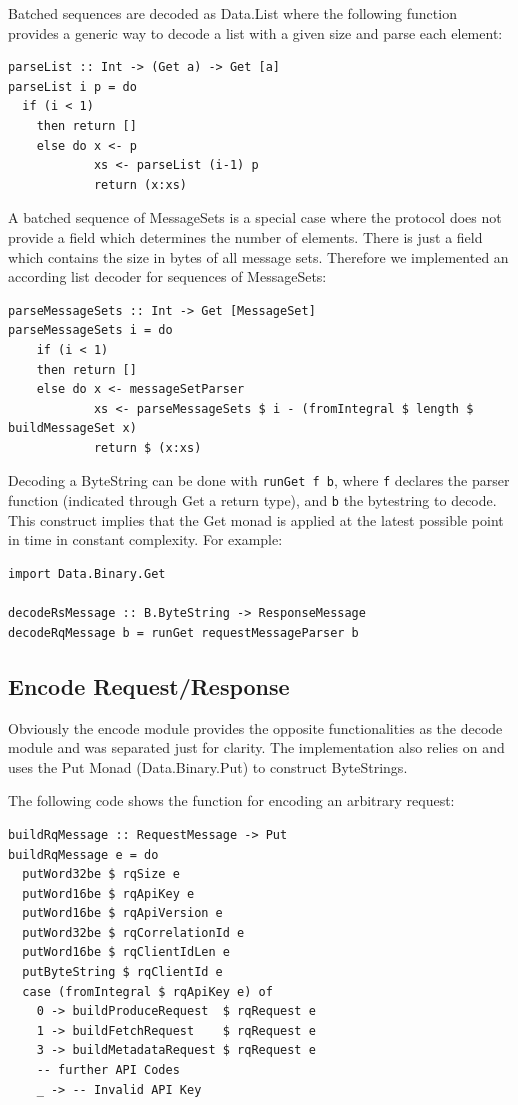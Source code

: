 Batched sequences are decoded as Data.List where the following function
provides a generic way to decode a list with a given size and parse each
element:
\begin{lstlisting}[caption={Decode list of any type}]
parseList :: Int -> (Get a) -> Get [a]
parseList i p = do 
  if (i < 1) 
    then return []
    else do x <- p
            xs <- parseList (i-1) p
            return (x:xs)
\end{lstlisting}

A batched sequence of MessageSets is a special case where the protocol does not provide a
field which determines the number of elements. There is just a field which contains
the size in bytes of all message sets. Therefore we implemented an according
list decoder for sequences of MessageSets:
\begin{lstlisting}[caption={Decode list of MessageSet's}]
parseMessageSets :: Int -> Get [MessageSet]
parseMessageSets i = do
    if (i < 1)
    then return []
    else do x <- messageSetParser
            xs <- parseMessageSets $ i - (fromIntegral $ length $ buildMessageSet x)
            return $ (x:xs) 
\end{lstlisting}

Decoding a ByteString can be done with \lstinline{runGet f b}, where
\lstinline{f} declares the parser function (indicated through Get a return type),
and  \lstinline{b} the bytestring to decode. This construct implies that the Get
monad is applied at the latest possible point in time in constant complexity. For example: 
\begin{lstlisting}
import Data.Binary.Get

decodeRsMessage :: B.ByteString -> ResponseMessage
decodeRqMessage b = runGet requestMessageParser b

\end{lstlisting}


\subsection{Encode Request/Response}
\label{sec:impl-prot-encoding}
Obviously the encode module provides the opposite functionalities as the decode
module and was separated just for clarity. The implementation also relies on
and uses the Put Monad (Data.Binary.Put) to construct ByteStrings.

The following code shows the function for encoding an arbitrary request:
\begin{lstlisting}[caption={Encode RequestMessage, depending on ApiKey}]
buildRqMessage :: RequestMessage -> Put
buildRqMessage e = do
  putWord32be $ rqSize e
  putWord16be $ rqApiKey e
  putWord16be $ rqApiVersion e
  putWord32be $ rqCorrelationId e
  putWord16be $ rqClientIdLen e
  putByteString $ rqClientId e
  case (fromIntegral $ rqApiKey e) of
    0 -> buildProduceRequest  $ rqRequest e
    1 -> buildFetchRequest    $ rqRequest e
    3 -> buildMetadataRequest $ rqRequest e
    -- further API Codes 
    _ -> -- Invalid API Key 
\end{lstlisting}

